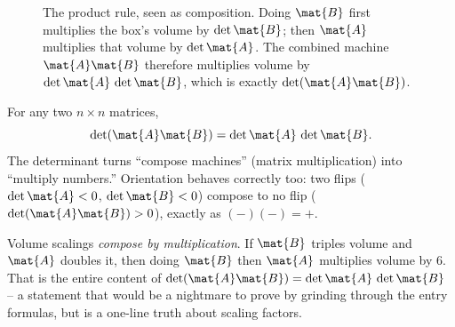 \begin{figure}[H]
\centering
{}
\caption{The product rule, seen as composition. Doing $\mat{B}$ first multiplies
the box's volume by $\det\mat{B}$; then $\mat{A}$ multiplies that volume by
$\det\mat{A}$. The combined machine $\mat{A}\mat{B}$ therefore multiplies volume by
$\det\mat{A}\,\det\mat{B}$, which is exactly $\det(\mat{A}\mat{B})$.}
\label{ch21:fig-product}
\end{figure}

\begin{formalbox}
For any two $n\times n$ matrices,
\[
  \det(\mat{A}\mat{B}) = \det\mat{A}\,\det\mat{B}.
\]
The determinant turns ``compose machines'' (matrix multiplication) into ``multiply
numbers.'' Orientation behaves correctly too: two flips ($\det\mat{A}<0$,
$\det\mat{B}<0$) compose to no flip ($\det(\mat{A}\mat{B})>0$), exactly as
$(-)(-)=+$.
\end{formalbox}

\begin{intuitionbox}
Volume scalings \emph{compose by multiplication}. If $\mat{B}$ triples volume and
$\mat{A}$ doubles it, then doing $\mat{B}$ then $\mat{A}$ multiplies volume by
$6$. That is the entire content of $\det(\mat{A}\mat{B}) = \det\mat{A}\,\det\mat{B}$
-- a statement that would be a nightmare to prove by grinding through the entry
formulas, but is a one-line truth about scaling factors.
\end{intuitionbox}

